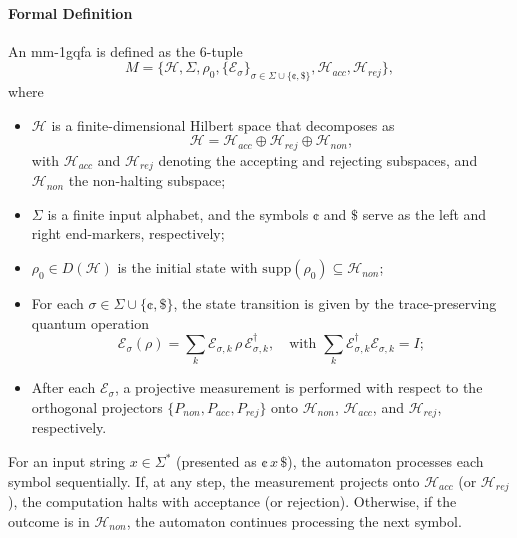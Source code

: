 \paragraph{Formal Definition} 
An \gls{mm-1gqfa} is defined as the 6-tuple
\[
M = \{ \mathcal{H},\Sigma,\rho_0,\{\mathcal{E}_\sigma\}_{\sigma\in\Sigma\cup\{\cent,\$\}},\mathcal{H}_{acc},\mathcal{H}_{rej}\},
\]
where
\begin{itemize}
  \item $\mathcal{H}$ is a finite-dimensional Hilbert space that decomposes as
  \[
  \mathcal{H}=\mathcal{H}_{acc}\oplus \mathcal{H}_{rej}\oplus \mathcal{H}_{non},
  \]
  with $\mathcal{H}_{acc}$ and $\mathcal{H}_{rej}$ denoting the accepting and rejecting subspaces, and $\mathcal{H}_{non}$ the non-halting subspace;
  \item $\Sigma$ is a finite input alphabet, and the symbols $\cent$ and $\$$ serve as the left and right end-markers, respectively;
  \item $\rho_0\in D(\mathcal{H})$ is the initial state with $\mathrm{supp}(\rho_0)\subseteq \mathcal{H}_{non}$;
  \item For each $\sigma\in\Sigma\cup\{\cent,\$\}$, the state transition is given by the trace-preserving quantum operation 
  \[
  \mathcal{E}_\sigma(\rho)=\sum_{k} \mathcal{E}_{\sigma,k}\,\rho\,\mathcal{E}_{\sigma,k}^\dagger,\quad \text{with } \sum_{k} \mathcal{E}_{\sigma,k}^\dagger \mathcal{E}_{\sigma,k}=I;
  \]
  \item After each $\mathcal{E}_\sigma$, a projective measurement is performed with respect to the orthogonal projectors $\{P_{non},P_{acc},P_{rej}\}$ onto $\mathcal{H}_{non}$, $\mathcal{H}_{acc}$, and $\mathcal{H}_{rej}$, respectively.
\end{itemize}
For an input string $x\in\Sigma^*$ (presented as $\cent\,x\,\$$), the automaton processes each symbol sequentially. If, at any step, the measurement projects onto $\mathcal{H}_{acc}$ (or $\mathcal{H}_{rej}$), the computation halts with acceptance (or rejection). Otherwise, if the outcome is in $\mathcal{H}_{non}$, the automaton continues processing the next symbol.


